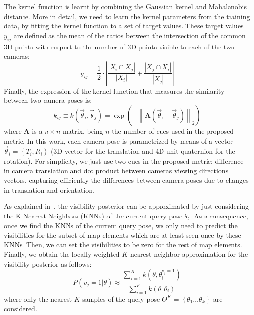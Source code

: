 The kernel function is learnt by combining the Gaussian kernel and Mahalanobis distance. More
in detail, we need to learn the kernel parameters from the training data, by fitting the kernel function to a set of target values. These target values $y_{ij}$ are defined as the mean of the ratios between the intersection of the common 3D points with respect to the number of 3D points visible to each of the two cameras:
%
\begin{equation}\label{eq:similarity_weighted}
y_{ij} = \frac{1}{2}\cdot \left| \frac{\left|X_i \cap X_j \right|}{\left|X_i\right|} + \frac{\left|X_j \cap X_i\right|}{\left|X_j\right|} \right|
\end{equation}
%
Finally, the expression of the kernel function that measures the similarity between two camera poses is:
%
\begin{equation}\label{eq:visibility_metric}
 k_{ij} \equiv k(\vec{\theta}_i,\vec{\theta}_j) =\exp\left(-\left\| \mathbf{A}(\vec{\theta}_i-\vec{\theta}_j)\right\|_{2}\right)
\end{equation}
%
where $\mathbf{A}$ is a $n \times n$ matrix, being $n$ the number of cues used in the proposed metric. In this work, each camera pose is parametrized by means of a vector $\vec{\theta}_i = \left\{T_{i},R_{i}\right\}$ (3D vector for the translation and 4D unit quaternion for the rotation). For simplicity, we just use two cues in the proposed metric: difference in camera translation and dot product
between cameras viewing directions vectors, capturing efficiently the differences between camera poses due to changes in translation and orientation.

As explained in~\cite{Alcantarilla11icra}, the visibility posterior can be approximated by just considering the K Nearest Neighbors (KNNs) of the current query pose $\theta_{t}$. As a consequence, once we find the KNNs of the current query pose, we only need to predict the visibilities for the subset of map elements which are at least seen once by these KNNs. Then, we can set the visibilities to be zero for
the rest of map elements. Finally, we obtain the locally weighted $K$ nearest neighbor approximation for the visibility posterior as follows:
%
\begin{equation} \label{eq:KNNVisibility}
P(v_{j}=1|\theta) \approx \frac{\sum\limits_{i=1}^{K}k(\theta,\theta_{i}^{v_{j}=1})}{\sum\limits_{i=1}^{K}k(\theta,\theta_{i})}
\end{equation}
%
where only the nearest $K$ samples of the query pose $\Theta^{K}=\left\{\theta_{1} \ldots \theta_{k}\right\}$ are considered.

